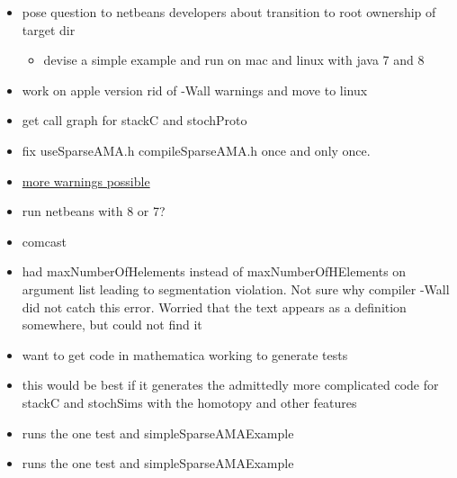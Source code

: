 \documentclass[hyperref]{labbook}
\begin{document}
\begin{itemize}
\item pose question to netbeans developers about transition to root ownership of target dir
  \begin{itemize}
  \item devise a simple example and run on mac and linux with java 7 and 8
  \end{itemize}
\item work on apple version rid of -Wall warnings and move to linux
\item get call graph for stackC and stochProto
\item fix useSparseAMA.h compileSparseAMA.h once and only once.
\item \href{http://www.network-theory.co.uk/docs/gccintro/gccintro_31.html}{more warnings possible}
\end{itemize}

\begin{itemize}
\item run netbeans with 8 or 7?
\item comcast
\end{itemize}


\begin{itemize}
\item had maxNumberOfHelements instead of maxNumberOfHElements on argument list leading to segmentation violation.  Not sure why compiler -Wall did not catch this error. Worried that the text appears as a definition somewhere, but could not find it
\item want to get code in mathematica working to generate tests 
\item this would be best if it generates the admittedly more complicated code for
stackC and stochSims with the homotopy and other features
\end{itemize}
\begin{itemize}
\item runs the one test and simpleSparseAMAExample
\end{itemize}
\begin{itemize}
\item runs the one test and simpleSparseAMAExample
\end{itemize}
\end{document}
